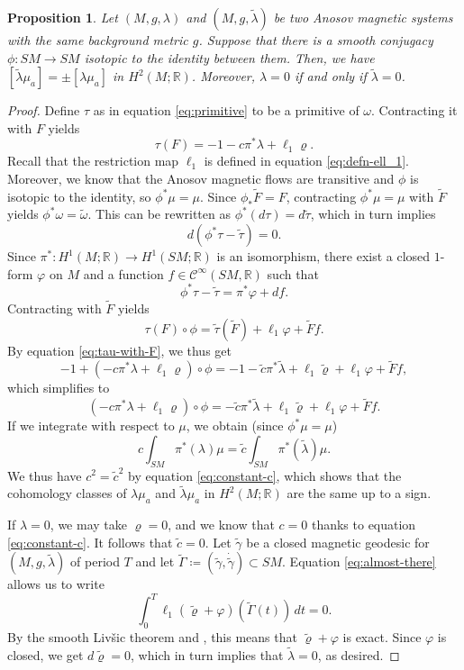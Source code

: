 \documentclass[reqno,12pt,letterpaper]{amsart}
\newtheorem{proposition}{Proposition}[section]
\theoremstyle{definition}
\theoremstyle{remark}
\theoremstyle{definition}
\numberwithin{equation}{section}
\newcommand{\R}{\mathbb{R}}
\begin{document}
\begin{proposition}\label{proposition:magnetic-katok}
Let $(M, g, \lambda)$ and $(M, g, \tilde{\lambda})$ be two Anosov magnetic systems with the same background metric $g$. Suppose that there is a smooth conjugacy $\phi : SM\to SM$ isotopic to the identity between them. Then, we have $[\tilde{\lambda}\mu_a]=\pm [\lambda\mu_a]$ in $H^2(M; \R)$. Moreover, $\lambda=0$ if and only if $\tilde{\lambda}=0$.
\end{proposition}
\begin{proof}
Define $\tau$ as in equation \eqref{eq:primitive} to be a primitive of $\omega$. Contracting it with $F$ yields
\begin{equation}\label{eq:tau-with-F}
\tau(F)=-1-c\pi^*\lambda +\ell_1\varrho.
\end{equation}
Recall that the restriction map $\ell_1$ is defined in equation \eqref{eq:defn-ell_1}. Moreover, we know that the Anosov magnetic flows are transitive and $\phi$ is isotopic to the identity, so $\phi^*\mu=\mu$. Since $\phi_*\widetilde{F}=F$, contracting $\phi^*\mu=\mu$ with $\widetilde{F}$ yields $\phi^*\omega=\tilde{\omega}$. This can be rewritten as $\phi^*(d\tau)=d\tilde{\tau}$, which in turn implies $$d(\phi^*\tau-\tilde{\tau})=0.$$ 
Since $\pi^*:H^1(M;\R)\to H^1(SM;\R)$ is an isomorphism, there exist a closed $1$-form $\varphi$ on $M$ and a function $f\in \mathcal{C}^\infty(SM, \R)$ such that
$$\phi^*\tau-\tilde{\tau} = \pi^*\varphi +df.$$
Contracting with $\widetilde{F}$ yields
$$\tau(F)\circ \phi = \tilde{\tau}(\widetilde{F})+\ell_1\varphi +\widetilde{F} f.$$
By equation \eqref{eq:tau-with-F}, we thus get
$$-1+(-c\pi^*\lambda +\ell_1\varrho)\circ \phi=-1-\tilde{c}\pi^*\tilde{\lambda}+\ell_1\tilde{\varrho}+\ell_1\varphi+\widetilde{F} f,$$
which simplifies to
\begin{equation}\label{eq:almost-there}
(-c\pi^*\lambda +\ell_1\varrho)\circ \phi=-\tilde{c}\pi^*\tilde{\lambda}+\ell_1\tilde{\varrho}+\ell_1\varphi+\widetilde{F} f.
\end{equation}
If we integrate with respect to $\mu$, we obtain (since $\phi^*\mu = \mu$)
$$c\int_{SM}\pi^*(\lambda) \mu=\tilde{c}\int_{SM}\pi^*(\tilde{\lambda})\mu.$$
We thus have $c^2=\tilde{c}^2$ by equation \eqref{eq:constant-c}, which shows that the cohomology classes of $\lambda\mu_a$ and $\tilde{\lambda}\mu_a$ in $H^2(M;\R)$ are the same up to a sign. 

If $\lambda=0$, we may take $\varrho=0$, and we know that $c=0$ thanks to equation \eqref{eq:constant-c}. It follows that $\tilde{c}=0$. Let $\tilde{\gamma}$ be a closed magnetic geodesic for $(M, g, \tilde{\lambda})$ of period $T$ and let $\widetilde{\Gamma}\coloneqq(\tilde{\gamma}, \dot{\tilde{\gamma}})\subset SM$. Equation \eqref{eq:almost-there} allows us to write 
\begin{equation*}
\int_0^T\ell_1(\tilde{\varrho}+\varphi)(\widetilde{\Gamma}(t))\, dt=0.
\end{equation*}
By the smooth Livšic theorem \cite[Theorem 2.1]{de-la-llave86} and \cite[Theorem B]{dairbekov05}, this means that $\tilde{\varrho}+\varphi$ is exact. Since $\varphi$ is closed, we get $d\tilde{\varrho}=0$, which in turn implies that $\tilde{\lambda}=0$, as desired. 
\end{proof}
\end{document}
